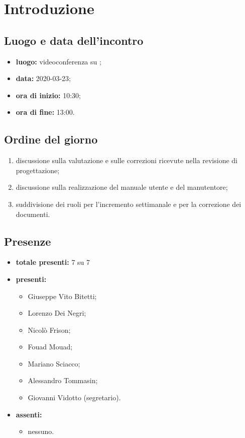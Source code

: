 \section*{Introduzione}

\subsection*{Luogo e data dell'incontro}
	\begin{itemize}
		\item \textbf{luogo:} videoconferenza su ;
		\item \textbf{data:} 2020-03-23;
		\item \textbf{ora di inizio:} 10:30;
		\item \textbf{ora di fine:} 13:00.
	\end{itemize}

\subsection*{Ordine del giorno}
	\begin{enumerate}
			\item discussione sulla valutazione e sulle correzioni ricevute nella revisione di progettazione;
			\item discussione sulla realizzazione del manuale utente e del manutentore;
			\item suddivisione dei ruoli per l'incremento settimanale e per la correzione dei documenti.
	\end{enumerate}

\subsection*{Presenze}
	\begin{itemize}
		\item \textbf{totale presenti:} 7 su 7
		\item \textbf{presenti: }
			\begin{itemize}
				\item Giuseppe Vito Bitetti;
				\item Lorenzo Dei Negri;
				\item Nicolò Frison;
				\item Fouad Mouad;
				\item Mariano Sciacco;
				\item Alessandro Tommasin;
				\item Giovanni Vidotto (segretario).
			\end{itemize}
		\item \textbf{assenti: }
			\begin{itemize}
				\item nessuno.
			\end{itemize}
	\end{itemize}


